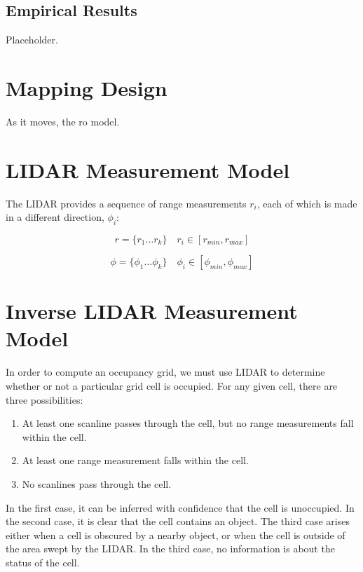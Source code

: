 \documentclass[11pt]{article} %
\begin{document}
\subsection{Empirical Results}

Placeholder.


\section{Mapping Design}
As it moves, the ro model.

\section{LIDAR Measurement Model}
The LIDAR provides a sequence of range measurements $r_i$, each of which is made in a different direction, $\phi_i$:

\begin{equation}
r = \{r_1 \dots r_k\} \quad r_i \in [r_{min}, r_{max}]
\end{equation}

\begin{equation}
\phi = \{\phi_1 \dots \phi_k\} \quad \phi_i \in [\phi_{min}, \phi_{max}]
\end{equation}

\section{Inverse LIDAR Measurement Model}
In order to compute an occupancy grid, we must use LIDAR to determine whether or not a particular grid cell is occupied.  For any given cell, there are three possibilities:

\begin{enumerate}
 \item At least one scanline passes through the cell, but no range measurements fall within the cell. \\
 \item At least one range measurement falls within the cell. \\
 \item No scanlines pass through the cell. \\
\end{enumerate}

In the first case, it can be inferred with confidence that the cell is unoccupied.  
In the second case, it is clear that the cell contains an object.  
The third case arises either when a cell is obscured by a nearby object, or when the cell is outside of the area swept by the LIDAR.  In the third case, no information is about the status of the cell.
\end{document}

